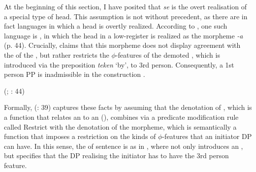 \documentclass[output=paper,nonflat,newtxmath]{langsci/langscibook}
\begin{document}
\begin{exe}
\ex \begin{xlist}
 \label{ex:lenardic: 26a}
 \label{ex:lenardic: 26b}
\end{xlist}
\end{exe}

\noindent At the beginning of this section, I have posited that \textit{se} is the overt realisation of a special type of   head. This assumption is not without precedent, as there are in fact languages in which a  head is overtly realized. According to \citet{legate2014}, one such language is , in which the  head in a low-register  is realized as the morpheme \textit{-a} (p. 44). Crucially, \citet{legate2014} claims that this morpheme does not display agreement with the  of the , but rather restricts the $\phi$-features of the demoted , which is introduced via the preposition \textit{teken} `by', to 3rd person. Consequently, a 1st person  PP is inadmissible in the construction .

\begin{exe}
\ex \begin{xlist}
\label{ex:lenardic: 27a}
\hfill (; \citealt{legate2014}: 44)\label{ex:lenardic: 27b}
\end{xlist}
\end{exe}

\noindent Formally, \citeauthor{legate2014} (\citeyear{legate2014}: 39) captures these facts by assuming that the denotation of , which is a function that relates an  to an  (\citealt{kratzer1996}), combines via a predicate modification rule called Restrict with the denotation of the morpheme, which is semantically a function that imposes a restriction on the kinds of $\phi$-features that an initiator DP can have. In this sense, the  of sentence  is as in , where  not only introduces an , but specifies that the DP realising the initiator has to have the 3rd person feature.
\end{document}
